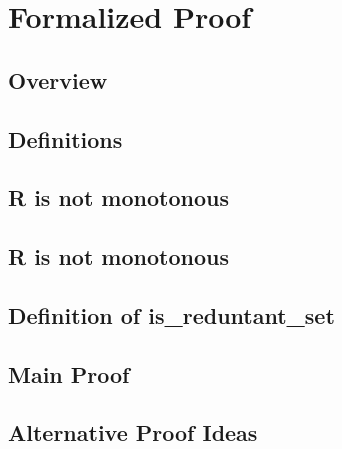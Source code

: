 \chapter{Formalized Proof}\label{sec:proof}

\section{Overview}

\section{Definitions}

\section{R is not monotonous}

\section{R is not monotonous}

\section{Definition of is\_reduntant\_set}

\section{Main Proof}

\section{Alternative Proof Ideas}
